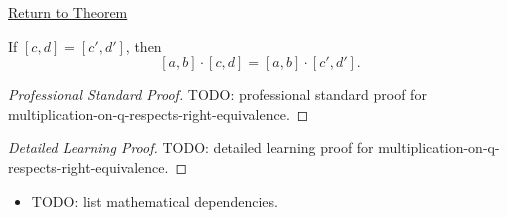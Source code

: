\newpage
{}
\label{prf:multiplication-on-q-respects-right-equivalence}

\begin{remark*}[Return]
\hyperref[lem:multiplication-on-q-respects-right-equivalence]{Return to Theorem}
\end{remark*}

\begin{lemma*}
If $[c,d]=[c',d']$, then
\[
[a,b]\cdot[c,d]=[a,b]\cdot[c',d'].
\]
\end{lemma*}

\begin{proof}[Professional Standard Proof]
\LRAProofBodyStart
TODO: professional standard proof for multiplication-on-q-respects-right-equivalence.
\end{proof}

\begin{proof}[Detailed Learning Proof]
\LRAProofBodyStart
TODO: detailed learning proof for multiplication-on-q-respects-right-equivalence.
\end{proof}

\begin{remark*}
\end{remark*}

\begin{dependencies}
\begin{itemize}
  \item TODO: list mathematical dependencies.
\end{itemize}
\end{dependencies}

\clearpage
